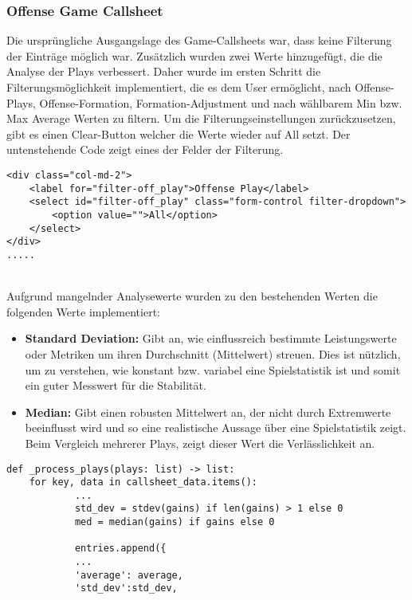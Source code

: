 \subsubsection{Offense Game Callsheet}
Die ursprüngliche Ausgangslage des Game-Callsheets war, dass keine Filterung der Einträge möglich war. Zusätzlich wurden zwei Werte hinzugefügt, die die Analyse der Plays verbessert. Daher wurde im ersten Schritt die Filterungsmöglichkeit implementiert, die es dem User ermöglicht, nach Offense-Plays, Offense-Formation, Formation-Adjustment und nach wählbarem Min bzw. Max Average Werten zu filtern. Um die Filterungseinstellungen zurückzusetzen, gibt es einen Clear-Button welcher die Werte wieder auf All setzt. Der untenstehende Code zeigt eines der Felder der Filterung.
\begin{verbatim}
<div class="col-md-2">
    <label for="filter-off_play">Offense Play</label>
    <select id="filter-off_play" class="form-control filter-dropdown">
        <option value="">All</option>
    </select>
</div>
.....
\end{verbatim}
\noindent
\\
Aufgrund mangelnder Analysewerte wurden zu den bestehenden Werten die folgenden Werte implementiert:
\begin{itemize}
    \item \textbf{Standard Deviation:} Gibt an, wie einflussreich bestimmte Leistungswerte oder Metriken um ihren Durchschnitt (Mittelwert) streuen. Dies ist nützlich, um zu verstehen, wie konstant bzw. variabel eine Spielstatistik ist und somit ein guter Messwert für die Stabilität.
    \item \textbf{Median:} Gibt einen robusten Mittelwert an, der nicht durch Extremwerte beeinflusst wird und so eine realistische Aussage über eine Spielstatistik zeigt. Beim Vergleich mehrerer Plays, zeigt dieser Wert die Verlässlichkeit an.
\end{itemize}
\begin{verbatim}
def _process_plays(plays: list) -> list:
    for key, data in callsheet_data.items():
            ...
            std_dev = stdev(gains) if len(gains) > 1 else 0
            med = median(gains) if gains else 0
            
            entries.append({
            ...
            'average': average,
            'std_dev':std_dev,
\end{verbatim}
\newpage
